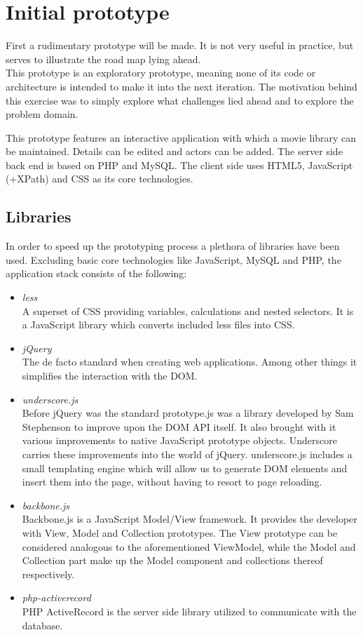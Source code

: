 \chapter{Initial prototype}
First a rudimentary prototype will be made. It is not very
useful in practice, but serves to illustrate the road map lying ahead.\\
This prototype is an exploratory prototype, meaning none of its code or
architecture is intended to make it into the next iteration. The motivation
behind this exercise was to simply explore what challenges lied ahead and to
explore the problem domain.

This prototype features an interactive application with which a movie
library can be maintained. Details can be edited and actors can be
added.
The server side back end is based on PHP and MySQL. The client side uses
HTML5, JavaScript (+XPath) and CSS as its core technologies.

\section{Libraries}
In order to speed up the prototyping process a plethora of libraries have been
used. Excluding basic core technologies like JavaScript, MySQL and PHP, the
application stack consists of the following:
\begin{itemize}
	\item \emph{less}\\
	A superset of CSS providing variables, calculations and nested selectors. It
	is a JavaScript library which converts included less files into CSS.
	\item \emph{jQuery}\\
	The de facto standard when creating web applications. Among other things it
	simplifies the interaction with the DOM.
	\item \emph{underscore.js}\\
	Before jQuery was the standard prototype.js was a library developed by
	Sam Stephenson to improve upon the DOM API itself. It also brought with it
	various improvements to native JavaScript prototype objects. Underscore
	carries these improvements into the world of jQuery. underscore.js includes a
	small templating engine which will allow us to generate DOM elements and
	insert them into the page, without having to resort to page reloading.
	\item \emph{backbone.js}\\
	Backbone.js is a JavaScript Model/View framework. It provides the developer
	with View, Model and Collection prototypes. The View prototype can be
	considered analogous to the aforementioned ViewModel, while the Model and
	Collection part make up the Model component and collections thereof
	respectively.
	\item \emph{php-activerecord}\\
	PHP ActiveRecord is the server side library utilized to communicate with the
	database.
	
\end{itemize}

